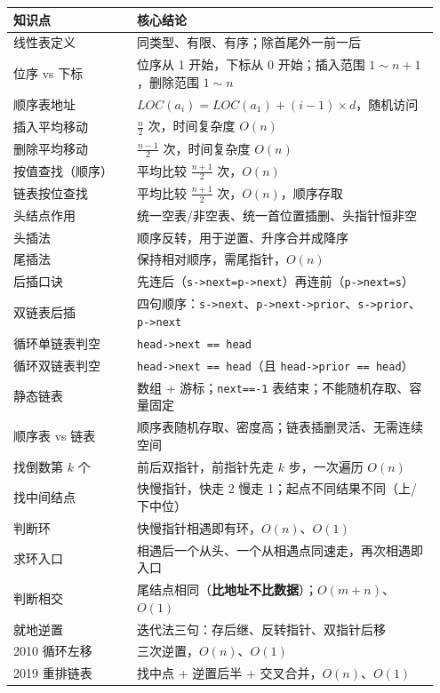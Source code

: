 \documentclass[11pt,openany,UTF8]{ctexbook}
\begin{document}
\begingroup\small\setlength{\tabcolsep}{4.0pt}
\begin{longtable}{@{}L{0.2794\linewidth}L{0.6663\linewidth}@{}}
\toprule
\textbf{知识点} & \textbf{核心结论} \\
\midrule
\endhead
线性表定义 & 同类型、有限、有序；除首尾外一前一后 \\
位序 vs 下标 & 位序从 1 开始，下标从 0 开始；插入范围 $1 \sim n+1$，删除范围 $1 \sim n$ \\
顺序表地址 & $LOC(a_i) = LOC(a_1) + (i-1)\times d$，随机访问 \\
插入平均移动 & $\frac{n}{2}$ 次，时间复杂度 $O(n)$ \\
删除平均移动 & $\frac{n-1}{2}$ 次，时间复杂度 $O(n)$ \\
按值查找（顺序） & 平均比较 $\frac{n+1}{2}$ 次，$O(n)$ \\
链表按位查找 & 平均比较 $\frac{n+1}{2}$ 次，$O(n)$，顺序存取 \\
头结点作用 & 统一空表/非空表、统一首位置插删、头指针恒非空 \\
头插法 & 顺序反转，用于逆置、升序合并成降序 \\
尾插法 & 保持相对顺序，需尾指针，$O(n)$ \\
后插口诀 & 先连后（\texttt{s->\allowbreak{}next=\allowbreak{}p->\allowbreak{}next}）再连前（\texttt{p->\allowbreak{}next=\allowbreak{}s}） \\
双链表后插 & 四句顺序：\texttt{s->\allowbreak{}next}、\texttt{p->\allowbreak{}next->\allowbreak{}prior}、\texttt{s->\allowbreak{}prior}、\texttt{p->\allowbreak{}next} \\
循环单链表判空 & \texttt{head->\allowbreak{}next =\allowbreak{}=\allowbreak{} head} \\
循环双链表判空 & \texttt{head->\allowbreak{}next =\allowbreak{}=\allowbreak{} head}（且 \texttt{head->\allowbreak{}prior =\allowbreak{}=\allowbreak{} head}） \\
静态链表 & 数组 + 游标；\texttt{next=\allowbreak{}=\allowbreak{}-1} 表结束；不能随机存取、容量固定 \\
顺序表 vs 链表 & 顺序表随机存取、密度高；链表插删灵活、无需连续空间 \\
找倒数第 $k$ 个 & 前后双指针，前指针先走 $k$ 步，一次遍历 $O(n)$ \\
找中间结点 & 快慢指针，快走 2 慢走 1；起点不同结果不同（上/下中位） \\
判断环 & 快慢指针相遇即有环，$O(n)$、$O(1)$ \\
求环入口 & 相遇后一个从头、一个从相遇点同速走，再次相遇即入口 \\
判断相交 & 尾结点相同（\textbf{比地址不比数据}）；$O(m+n)$、$O(1)$ \\
就地逆置 & 迭代法三句：存后继、反转指针、双指针后移 \\
2010 循环左移 & 三次逆置，$O(n)$、$O(1)$ \\
2019 重排链表 & 找中点 + 逆置后半 + 交叉合并，$O(n)$、$O(1)$ \\
\bottomrule
\end{longtable}
\endgroup
\end{document}

